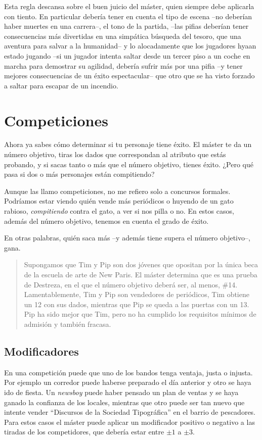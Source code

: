 Esta regla descansa sobre el buen juicio del máster, quien siempre debe aplicarla con tiento. En particular debería tener en cuenta el tipo de escena --no deberían haber muertes en una carrera--, el tono de la partida, --las pifias deberían tener consecuencias más divertidas en una simpática búsqueda del tesoro, que una aventura para salvar a la humanidad-- y lo alocadamente que los jugadores hyaan estado jugando --si un jugador intenta saltar desde un tercer piso a un coche en marcha para demostrar su agilidad, debería sufrir más por una pifia --y tener mejores consecuencias de un éxito espectacular-- que otro que se ha visto forzado a saltar para escapar de un incendio.


\section{Competiciones}

Ahora ya sabes cómo determinar si tu personaje tiene éxito. El máster te da
un número objetivo, tiras los dados que correspondan al atributo que estás probando,
y si sacas tanto o más que el número objetivo, tienes éxito. ¿Pero qué pasa
si dos o más personajes están compitiendo?

Aunque las llamo competiciones, no me refiero solo a concursos formales. 
Podríamos estar viendo quién vende más periódicos o huyendo de un gato rabioso,
\emph{compitiendo} contra el gato, a ver si nos pilla o no. En estos casos, además del número objetivo, 
tenemos en cuenta el grado de éxito.

En otras palabras, quién saca más --y además tiene supera el número objetivo--, gana.

\begin{quotation}
Supongamos que Tim y Pip son dos jóvenes que opositan por la única beca de la
escuela de arte de New Paris. El máster determina que es una prueba de Destreza,
en el que el número objetivo deberá ser, al menos, \#14. Lamentablemente, Tim y
Pip son vendedores de periódicos, Tim obtiene un 12 con sus dados, mientras que 
Pip se queda a las puertas con un 13. Pip ha sido mejor que Tim, pero no ha cumplido
los requisitos mínimos de admisión y también fracasa.
\end{quotation}

\subsection{Modificadores}

En una competición puede que uno de los bandos tenga ventaja, justa o injusta. Por
ejemplo un corredor puede haberse preparado el día anterior y otro se haya ido de
fiesta. Un \emph{newsboy} puede haber pensado un plan de ventas y se haya ganado la
confianza de los locales, mientras que otro puede ser tan nuevo que intente vender
\enquote{Discursos de la Sociedad Tipográfica} en el barrio de pescadores. Para estos casos
el máster puede aplicar un modificador positivo o negativo a las tiradas de los
competidores, que debería estar entre $\pm1$ a $\pm3$.

